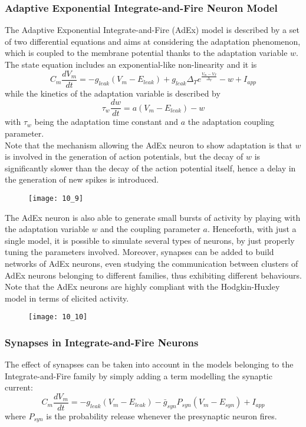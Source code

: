 \subsubsection{Adaptive Exponential Integrate-and-Fire Neuron Model}
The Adaptive Exponential Integrate-and-Fire (AdEx) model is described by a set of two differential equations and
aims at considering the adaptation phenomenon, which is coupled to the membrane potential thanks to the
adaptation variable \(w\).\\
The state equation includes an exponential-like non-linearity and it is
\begin{equation*}
    C_{m}\frac{dV_{m}}{dt}=-g_{leak}(V_{m}-E_{leak})+g_{leak}\Delta_{T}e^{\frac{V_{m}-V_{T}}{\Delta_{T}}}-w+I_{app}
\end{equation*}
while the kinetics of the adaptation variable is described by
\begin{equation*}
    \tau_{w}\frac{dw}{dt}=a(V_{m}-E_{leak})-w
\end{equation*}
with \(\tau_{w}\) being the adaptation time constant and \(a\) the adaptation coupling parameter.\\
Note that the mechanism allowing the AdEx neuron to show adaptation is that \(w\) is involved in the generation
of action potentials, but the decay of \(w\) is significantly slower than the decay of the action potential itself,
hence a delay in the generation of new spikes is introduced.
\begin{figure}[H]
    \texttt{[image: 10\_9]}
    \centering
\end{figure}
The AdEx neuron is also able to generate small bursts of activity by playing with the adaptation variable \(w\) and
the coupling parameter \(a\). Henceforth, with just a single model, it is possible to simulate several types of neurons,
by just properly tuning the parameters involved. Moreover, synapses can be added to build networks of AdEx neurons, even
studying the communication between clusters of AdEx neurons belonging to different families, thus exhibiting different
behaviours. Note that the AdEx neurons are highly compliant with the Hodgkin-Huxley model in terms of elicited activity.
\begin{figure}[H]
    \texttt{[image: 10\_10]}
    \centering
\end{figure}
\subsubsection{Synapses in Integrate-and-Fire Neurons}
The effect of synapses can be taken into account in the models belonging to the Integrate-and-Fire family
by simply adding a term modelling the synaptic current:
\begin{equation*}
    C_{m}\frac{dV_{m}}{dt}=-g_{leak}(V_{m}-E_{leak})-\bar{g}_{syn}P_{syn}(V_{m}-E_{syn})+I_{app}
\end{equation*}
where \(P_{syn}\) is the probability release whenever the presynaptic neuron fires.

